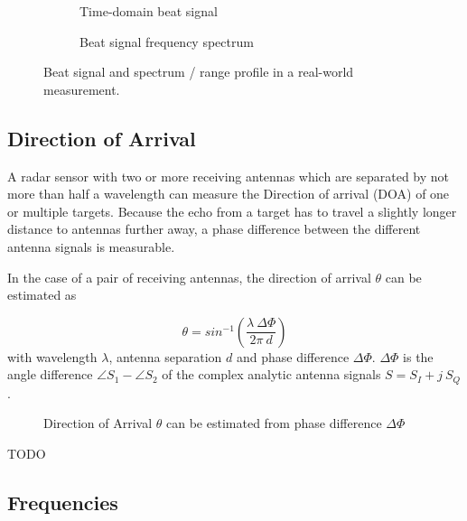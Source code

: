 \begin{figure}[htp]
    \centering
    \begin{subfigure}{0.475\textwidth}
      \def\svgwidth{\linewidth} \small
      
      \caption{\label{fig:rawbeat_t}Time-domain beat signal}
    \end{subfigure}
    \hfill
    \begin{subfigure}{0.475\textwidth}
      \def\svgwidth{\linewidth} \small
      
      \caption{\label{fig:rawbeat_f}Beat signal frequency spectrum}
    \end{subfigure}
    \caption{\label{fig:fig_raw_beat}Beat signal and spectrum / range profile in a real-world measurement.}
\end{figure}

\subsection{Direction of Arrival}\label{direction-of-arrival}

A radar sensor with two or more receiving antennas which are separated
by not more than half a wavelength can measure the Direction of arrival
(DOA) of one or multiple targets. Because the echo from a target has to
travel a slightly longer distance to antennas further away, a phase
difference between the different antenna signals is measurable.

In the case of a pair of receiving antennas, the direction of arrival
\(\theta\) can be estimated \cite{VanZeijl2014} as


\begin{equation} \label{eq:doa}
	\theta = sin^{-1}\left({\frac{\lambda~\Delta\Phi}{2\pi ~d}}\right)
\end{equation}
with wavelength \(\lambda\), antenna separation \(d\) and phase
difference \(\Delta\Phi\). \(\Delta\Phi\) is the angle difference
\(\angle S_1 - \angle S_2\) of the complex analytic antenna signals
\(S = S_I + j~S_Q\).

\begin{figure}[htp]
    \centering
    \def\svgwidth{10cm}
    
    \caption{\label{fig:doa}Direction of Arrival \(\theta\) can be estimated from phase difference \(\Delta\Phi\)}
\end{figure}

TODO
\cite{Hacker2010} \cite{Cho2017}

\subsection{Frequencies}\label{frequencies}

